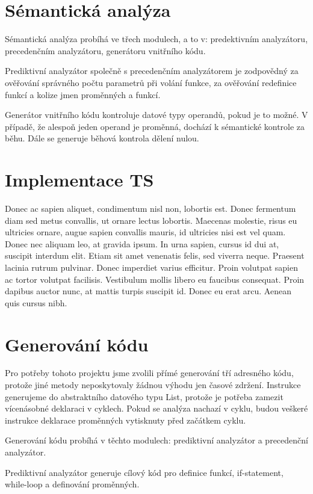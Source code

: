\documentclass[11pt, a4paper]{article}
\begin{document}
\section{Sémantická analýza}
Sémantická analýza probíhá ve třech modulech, a to v: predektivním analyzátoru, precedenčním analyzátoru, generátoru vnitřního kódu. 

Prediktivní analyzátor společně s precedenčním analyzátorem je zodpovědný za ověřování správného počtu parametrů při volání funkce, za ověřování redefinice funkcí a kolize jmen proměnných a funkcí. 

Generátor vnitřního kódu kontroluje datové typy operandů, pokud je to možné. V případě, že alespoň jeden operand je proměnná, dochází k sémantické kontrole za běhu. Dále se generuje běhová kontrola dělení nulou. 

\section{Implementace TS}
Donec ac sapien aliquet, condimentum nisl non, lobortis est. Donec fermentum diam sed metus convallis, ut ornare lectus lobortis. Maecenas molestie, risus eu ultricies ornare, augue sapien convallis mauris, id ultricies nisi est vel quam. Donec nec aliquam leo, at gravida ipsum. In urna sapien, cursus id dui at, suscipit interdum elit. Etiam sit amet venenatis felis, sed viverra neque. Praesent lacinia rutrum pulvinar. Donec imperdiet varius efficitur. Proin volutpat sapien ac tortor volutpat facilisis. Vestibulum mollis libero eu faucibus consequat. Proin dapibus auctor nunc, at mattis turpis suscipit id. Donec eu erat arcu. Aenean quis cursus nibh.

\section{Generování kódu}
Pro potřeby tohoto projektu jsme zvolili přímé generování tří adresného kódu, protože jiné metody neposkytovaly žádnou výhodu jen časové zdržení. Instrukce generujeme do abstraktního datového typu List, protože je potřeba zamezit vícenásobné deklaraci v cyklech. Pokud se analýza nachazí v cyklu, budou veškeré instrukce deklarace proměnných vytisknuty před začátkem cyklu.

Generování kódu probíhá v těchto modulech: prediktivní analyzátor a precedenční analyzátor. 

Prediktivní analyzátor generuje cílový kód pro definice funkcí, if-statement, while-loop a definování proměnných.
\end{document}
